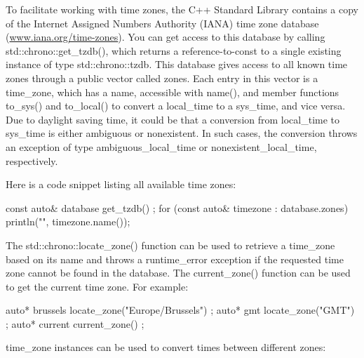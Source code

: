 To facilitate working with time zones, the C++ Standard Library contains a copy of the Internet Assigned Numbers Authority (IANA) time zone database (\url{www.iana.org/time-zones}). You can get access to this database by calling std::chrono::get\_tzdb(), which returns a reference-to-const to a single existing instance of type std::chrono::tzdb. This database gives access to all known time zones through a public vector called zones. Each entry in this vector is a time\_zone, which has a name, accessible with name(), and member functions to\_sys() and to\_local() to convert a local\_time to a sys\_time, and vice versa. Due to daylight saving time, it could be that a conversion from local\_time to sys\_time is either ambiguous or nonexistent. In such cases, the conversion throws an exception of type ambiguous\_local\_time or nonexistent\_local\_time, respectively.

Here is a code snippet listing all available time zones:

\begin{cpp}
const auto& database { get_tzdb() };
for (const auto& timezone : database.zones) {
    println("{}", timezone.name());
}
\end{cpp}

The std::chrono::locate\_zone() function can be used to retrieve a time\_zone based on its name and throws a runtime\_error exception if the requested time zone cannot be found in the database. The current\_zone() function can be used to get the current time zone. For example:

\begin{cpp}
auto* brussels { locate_zone("Europe/Brussels") };
auto* gmt { locate_zone("GMT") };
auto* current { current_zone() };
\end{cpp}

time\_zone instances can be used to convert times between different zones:


